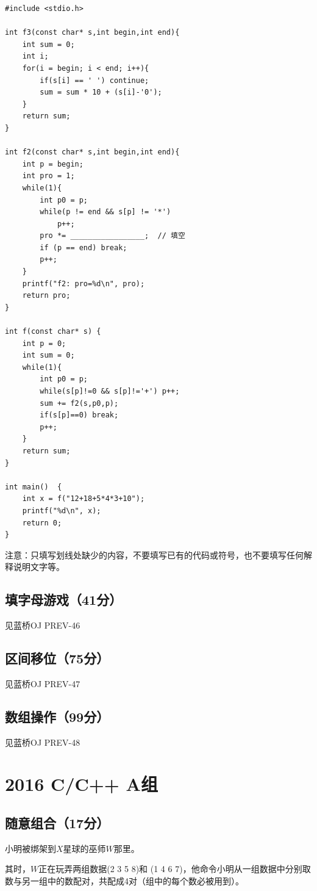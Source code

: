 \documentclass[a4paper, 12pt, twocolumn]{ctexart}
\begin{document}
	\begin{lstlisting}
#include <stdio.h>
	
int f3(const char* s,int begin,int end){
	int sum = 0;
	int i;
	for(i = begin; i < end; i++){
		if(s[i] == ' ') continue;
		sum = sum * 10 + (s[i]-'0');
	}
	return sum;
}
	
int f2(const char* s,int begin,int end){
	int p = begin;
	int pro = 1;
	while(1){
		int p0 = p;
		while(p != end && s[p] != '*')
			p++;
		pro *= _________________;  // 填空
		if (p == end) break; 
		p++;
	}
	printf("f2: pro=%d\n", pro);
	return pro;
}
	
int f(const char* s) {
	int p = 0;
	int sum = 0;
	while(1){
		int p0 = p;
		while(s[p]!=0 && s[p]!='+') p++;
		sum += f2(s,p0,p);
		if(s[p]==0) break;
		p++;
	}
	return sum;
}
	
int main()	{
	int x = f("12+18+5*4*3+10");
	printf("%d\n", x);
	return 0;
}
	\end{lstlisting}
	
	注意：只填写划线处缺少的内容，不要填写已有的代码或符号，也不要填写任何解释说明文字等。
	
	
	\subsection{填字母游戏（41分）}
	
	见蓝桥OJ PREV-46
	
	\subsection{区间移位（75分）}
	
	见蓝桥OJ PREV-47
	
	\subsection{数组操作（99分）}
	
	见蓝桥OJ PREV-48
	
	\section{2016 C/C++ A组}
	
	\subsection{随意组合（17分）}
	
	小明被绑架到$X$星球的巫师$W$那里。
	
	其时，$W$正在玩弄两组数据(2 3 5 8)和 (1 4 6 7)，他命令小明从一组数据中分别取数与另一组中的数配对，共配成4对（组中的每个数必被用到）。
	
\end{document}
